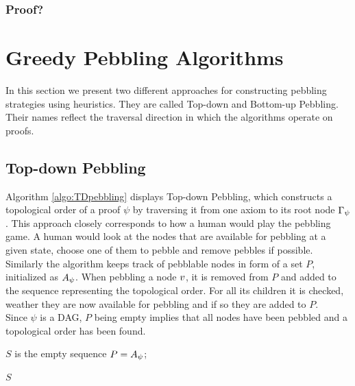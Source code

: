 \documentclass{llncs}
\begin{document}
\subsubsection*{Proof?}

\section{Greedy Pebbling Algorithms}
\label{section:algorithms}

In this section we present two different approaches for constructing pebbling strategies using heuristics.
They are called Top-down and Bottom-up Pebbling. Their names reflect the traversal direction in which the algorithms operate on proofs.

\subsection{Top-down Pebbling}

Algorithm \ref{algo:TDpebbling} displays Top-down Pebbling, which constructs a topological order of a proof $\psi$ by traversing it from one axiom to its root node $\Gamma_{\psi}$.
This approach closely corresponds to how a human would play the pebbling game. 
A human would look at the nodes that are available for pebbling at a given state, choose one of them to pebble and remove pebbles if possible.\\
Similarly the algorithm keeps track of pebblable nodes in form of a set $P$, initialized as $A_{\psi}$.
When pebbling a node $v$, it is removed from $P$ and added to the sequence representing the topological order. 
For all its children it is checked, weather they are now available for pebbling and if so they are added to $P$.\\
Since $\psi$ is a DAG, $P$ being empty implies that all nodes have been pebbled and a topological order has been found.


\begin{algorithm}[h]
	
	$S$ is the empty sequence\;
	$P = A_{\psi}$;
	
	
	\Return $S$\;
	
  \caption[.]{}
  \label{algo:TDpebbling}
\end{algorithm}
\end{document}
